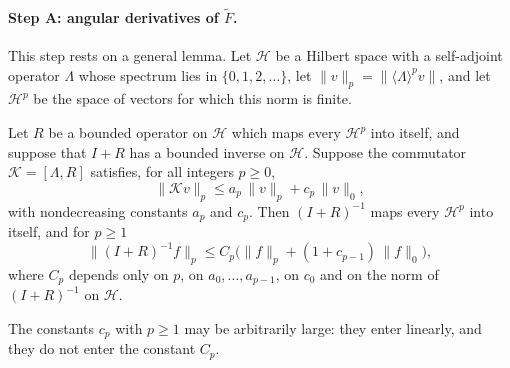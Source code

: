 \paragraph{Step A: angular derivatives of $\widetilde F$.}
This step rests on a general lemma. Let $\mathcal H$ be a Hilbert
space with a self-adjoint operator $\Lambda$ whose spectrum lies in
$\{0,1,2,\ldots\}$, let $\|v\|_p=\|\langle\Lambda\rangle^pv\|$, and
let $\mathcal H^p$ be the space of vectors for which this norm is
finite.

\begin{lemma}
\label{lem:ang-base-inverse-regularity}
Let $R$ be a bounded operator on $\mathcal H$ which maps every
$\mathcal H^p$ into itself, and suppose that $I+R$ has a bounded
inverse on $\mathcal H$. Suppose the commutator
$\mathscr K=[\Lambda,R]$ satisfies, for all integers $p\ge0$,
\begin{equation}\label{eq:commutator-hypothesis}
 \|\mathscr Kv\|_p\le a_p\,\|v\|_p+c_p\,\|v\|_0 ,
\end{equation}
with nondecreasing constants $a_p$ and $c_p$. Then $(I+R)^{-1}$ maps every
$\mathcal H^p$ into itself, and for $p\ge1$
\begin{equation}\label{eq:commutator-conclusion}
 \|(I+R)^{-1}f\|_p\le C_p\bigl(\|f\|_p+(1+c_{p-1})\,\|f\|_0\bigr),
\end{equation}
where $C_p$ depends only on $p$, on $a_0,\ldots,a_{p-1}$, on $c_0$
and on the norm of $(I+R)^{-1}$ on $\mathcal H$.
\end{lemma}

The constants $c_p$ with $p\ge1$ may be arbitrarily large: they enter
linearly, and they do not enter the constant $C_p$.

